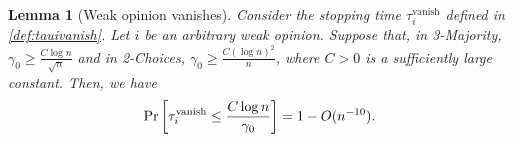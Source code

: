 \documentclass[letterpaper,11pt]{article}
\newtheorem{lemma}[theorem]{Lemma}
\newcommand{\alphanorm}{\gamma}
\newcommand{\cnormdown}{c^{\downarrow}_\alphanorm}
\newcommand{\cactive}{c^{\mathrm{active}}}
\newcommand{\tauivanish}{\tau^{\mathrm{vanish}}_i}
\begin{document}
\begin{lemma}[Weak opinion vanishes]\label{lem:weakvanish}
  Consider the stopping time $ \tauivanish $ defined in \cref{def:tauivanish}.
  Let $ i $ be an arbitrary weak opinion. %
  Suppose that, in 3-Majority, $ \alphanorm_0 \ge \frac{C\log n}{\sqrt{n}} $ and in 2-Choices, $ \alphanorm_0 \ge \frac{C(\log n)^2}{n} $, where $C>0$ is a sufficiently large constant. %
  Then, we have
  \begin{align*} 
     \Pr\qty[ \tauivanish \le \frac{C\log n}{\alphanorm_0} ] = 1-O(n^{-10}).
  \end{align*}
\end{lemma}
\end{document}
